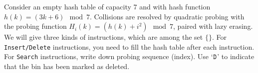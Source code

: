 Consider an empty hash table of capacity 7 and with hash function \(h(k) = (3k + 6) \mod 7\). Collisions are resolved by quadratic probing with the probing function \(H_i(k) = (h(k) + i^2)\mod 7\), paired with lazy erasing. We will give three kinds of instructions, which are among the set  $\{$$\}$. For \texttt{Insert/Delete} instructions, you need to fill the hash table after each instruction. For \texttt{Search} instructions, write down probing sequence (index). Use `\(\texttt{D}\)' to indicate that the bin has been marked as deleted.

